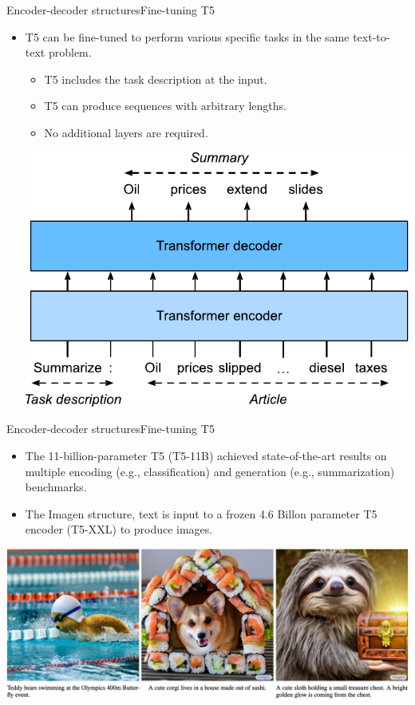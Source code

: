 \documentclass{beamer}
\begin{document}
\begin{frame}{Encoder-decoder structures}{Fine-tuning T5}
\begin{itemize}
    \item T5 can be fine-tuned to perform various specific tasks in the same text-to-text problem.
    \begin{itemize}
        \item T5 includes the task description at the input. 
        \item T5 can produce sequences with arbitrary lengths. 
        \item No additional layers are required. 
    \end{itemize}
    \begin{center}
        \includegraphics[scale=0.5]{Module 6 (Attention-based networks)/pics/t5-finetune-summarization.pdf}
    \end{center}
\end{itemize}    
\end{frame}
\begin{frame}{Encoder-decoder structures}{Fine-tuning T5}
    \begin{itemize}
        \item The 11-billion-parameter T5 (T5-11B) achieved state-of-the-art results on multiple encoding (e.g., classification) and generation (e.g., summarization) benchmarks. 
        \item  The Imagen structure, text is input to a frozen 4.6 Billon parameter T5 encoder (T5-XXL) to produce images.
    \end{itemize}
    \begin{center}
        \includegraphics[scale=0.2]{Module 6 (Attention-based networks)/pics/imagen.png}
    \end{center}
\end{frame}
\end{document}
